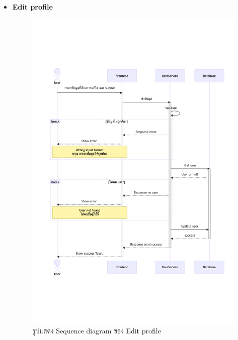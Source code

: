 \documentclass[12pt,oneside,openright,a4paper]{cpe-thai-project}
\begin{document}
\begin{itemize}
    \newpage
    \item \textbf{Edit profile} \\
    \begin{figure}[!ht]\centering
        \includegraphics[width=13cm, trim={0 6cm 0 6cm},clip]{./assets/sequence-diagram/edit-profile.png}
        \caption{รูปแสดง Sequence diagram ของ Edit profile}\label{fig:sqEditProfile}
    \end{figure}


\end{itemize}
\end{document}
